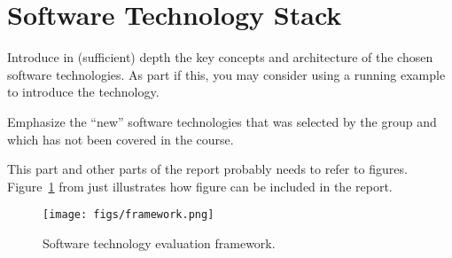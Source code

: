 \section{Software Technology Stack}
\label{sec:technology}

Introduce in (sufficient) depth the key concepts and architecture of the chosen software technologies. As part if this, you may consider using a running example to introduce the technology.

Emphasize the “new” software technologies that was selected by the group and which has not been covered in the course.

This part and other parts of the report probably needs to refer to
figures. Figure~\ref{fig:framework} from \cite{brown:96} just
illustrates how figure can be included in the report.

\begin{figure}
  \centering
  \texttt{[image: figs/framework.png]}
  \caption{Software technology evaluation framework.}
  \label{fig:framework}
\end{figure}
